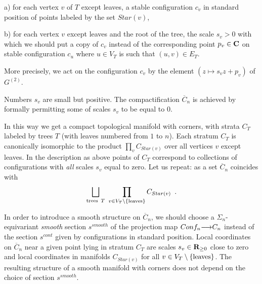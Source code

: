          a) for each vertex $v$ of $T$ except leaves,
          a stable configuration $c_v$ in standard position
          of points
         labeled by the set $Star(v)$,
         
         b) for each vertex $v$ except leaves and
         the root of the tree,
         the scale $s_v>0$ with which we should put a copy
          of $c_v$ instead of the corresponding point $p_v\in {\bf C}$ on 
            stable configuration $c_u$ where $u\in V_T$ is such that
            $(u,v)\in E_T$.
            
            More precisely, we act on the configuration $c_v$ by the 
            element $(z\mapsto s_v z+p_v)$ of $G^{(2)}$.
           
           Numbers $s_v$ are small but positive.
            The compactification $\overline{C}_n$ is achieved by 
           formally  permitting  some of scales
           $s_v$ to be equal to $0$. 
           
           In this way we get a compact topological manifold with corners,
            with strata $C_T$
            labeled by trees $T$ (with leaves numbered from $1$
            to $n$). Each stratum $C_T$ is canonically isomorphic to
             the product $\prod_v C_{Star(v)}$ over all vertices $v$ 
             except 
             leaves. In the description as above points of $C_T$
             correspond to collections of configurations with {\it all}
              scales $s_v$ equal to zero. Let us repeat: as a set
              $\overline{C}_n$ coincides with
              $$\bigsqcup_{{\rm trees}\,\,\,T}\,\, \prod_{v\in V_T\setminus
              \{\rm leaves\}} C_{Star(v)}\,\,\,.$$
             
           In order to introduce a smooth structure on 
           $\overline{C}_n$, we should choose a $\Sigma_n$-equivariant
           {\it smooth}
            section $s^{smooth}$ of the projection map $Conf_n{\longrightarrow} C_n$
             instead of the section $s^{cont}$ given by 
             configurations in standard
              position. Local coordinates on $\overline{C}_n$ near a
               given point lying in stratum $C_T$ are scales $s_v\in{\bf R}_{\ge 0}$
               close to zero and local coordinates in manifolds 
                $C_{Star(v)}$ for all $v\in V_T\setminus
              \{\rm leaves\}$.
                   The resulting structure of a smooth
               manifold with corners does not depend
                on the choice of section $s^{smooth}$.
              
